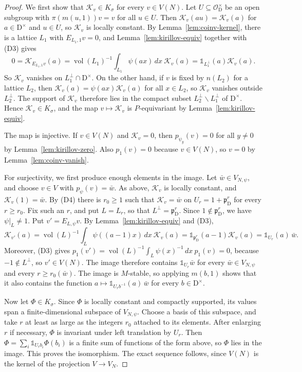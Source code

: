 \documentclass[11pt]{amsart}
\numberwithin{equation}{section}
\theoremstyle{plain}
\theoremstyle{definition}
\theoremstyle{remark}
\newcommand{\one}{\mathds{1}}
\newcommand{\cO}{\mathcal{O}}
\DeclareMathOperator{\vol}{vol}
\newcommand{\Kir}{\mathcal{K}}
\begin{document}
\begin{proof}
	We first show that $\Kir_v\in K_\sigma$ for every $v\in V(N)$. Let $U\subseteq\cO_{\mathrm{D}}^\times$ be an open subgroup with $\pi(m(u,1))v=v$ for all $u\in U$. Then $\Kir_v(au)=\Kir_v(a)$ for $a\in\mathrm{D}^\times$ and $u\in U$, so $\Kir_v$ is locally constant. By Lemma~\ref{lem:coinv-kernel}, there is a lattice $L_1$ with $E_{L_1,1}v=0$, and Lemma~\ref{lem:kirillov-equiv} together with (D3) gives
	$$0=\Kir_{E_{L_1,1}v}(a)=\vol(L_1)^{-1}\int_{L_1}\psi(ax)\,dx\ \Kir_v(a)=\one_{L_1^\perp}(a)\Kir_v(a).$$
	So $\Kir_v$ vanishes on $L_1^\perp\cap\mathrm{D}^\times$. On the other hand, if $v$ is fixed by $n(L_2)$ for a lattice $L_2$, then $\Kir_v(a)=\psi(ax)\Kir_v(a)$ for all $x\in L_2$, so $\Kir_v$ vanishes outside $L_2^\perp$. The support of $\Kir_v$ therefore lies in the compact subset $L_2^\perp\smallsetminus L_1^\perp$ of $\mathrm{D}^\times$. Hence $\Kir_v\in K_\sigma$, and the map $v\mapsto\Kir_v$ is $P$-equivariant by Lemma~\ref{lem:kirillov-equiv}.
	
	The map is injective. If $v\in V(N)$ and $\Kir_v=0$, then $p_{\psi_y}(v)=0$ for all $y\ne0$ by Lemma~\ref{lem:kirillov-zero}. Also $p_1(v)=0$ because $v\in V(N)$, so $v=0$ by Lemma~\ref{lem:coinv-vanish}.
	
	For surjectivity, we first produce enough elements in the image. Let $\bar w\in V_{N,\psi}$, and choose $v\in V$ with $p_\psi(v)=\bar w$. As above, $\Kir_v$ is locally constant, and $\Kir_v(1)=\bar w$. By (D4) there is $r_0\ge1$ such that $\Kir_v=\bar w$ on $U_r=1+\mathfrak p_{\mathrm{D}}^r$ for every $r\ge r_0$. Fix such an $r$, and put $L=L_r$, so that $L^\perp=\mathfrak p_{\mathrm{D}}^r$. Since $1\notin\mathfrak p_{\mathrm{D}}^r$, we have $\psi|_L\ne1$. Put $v'=E_{L,\psi}v$. By Lemma~\ref{lem:kirillov-equiv} and (D3),
	\[
	\Kir_{v'}(a)=\vol(L)^{-1}\int_L\psi((a-1)x)\,dx\ \Kir_v(a)=\one_{\mathfrak p_{\mathrm{D}}^r}(a-1)\Kir_v(a)=\one_{U_r}(a)\,\bar w.
	\]
	Moreover, (D3) gives $p_1(v')=\vol(L)^{-1}\int_L\psi(x)^{-1}\,dx\ p_1(v)=0$, because $-1\notin L^\perp$, so $v'\in V(N)$. The image therefore contains $\one_{U_r}\bar w$ for every $\bar w\in V_{N,\psi}$ and every $r\ge r_0(\bar w)$. The image is $M$-stable, so applying $m(b,1)$ shows that it also contains the function $a\mapsto\one_{U_rb^{-1}}(a)\,\bar w$ for every $b\in\mathrm{D}^\times$.
	
	Now let $\Phi\in K_\sigma$. Since $\Phi$ is locally constant and compactly supported, its values span a finite-dimensional subspace of $V_{N,\psi}$. Choose a basis of this subspace, and take $r$ at least as large as the integers $r_0$ attached to its elements. After enlarging $r$ if necessary, $\Phi$ is invariant under left translation by $U_r$. Then $\Phi=\sum_i\one_{U_rb_i}\Phi(b_i)$ is a finite sum of functions of the form above, so $\Phi$ lies in the image. This proves the isomorphism. The exact sequence follows, since $V(N)$ is the kernel of the projection $V\to V_N$.
\end{proof}
\end{document}
